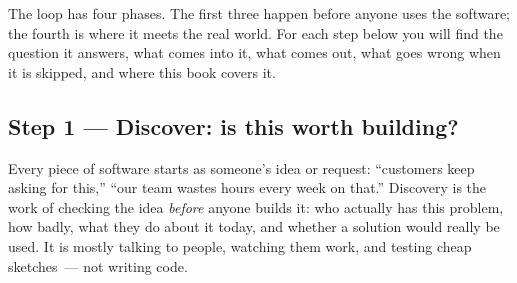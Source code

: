 \label{how-software-gets-built:layer-1-the-loop}

\begin{codebox}[short]

\begin{Shaded}
\begin{Highlighting}[]
\end{Highlighting}
\end{Shaded}

\end{codebox}

\noindent{}The loop has four phases. The first three happen before anyone uses the software; the fourth is where it meets the real world. For each step below you will find the question it answers, what comes into it, what comes out, what goes wrong when it is skipped, and where this book covers it.

\subsection*{Step 1 --- Discover: is this worth building?}\label{how-software-gets-built:step-1--discover-is-this-worth-building}

Every piece of software starts as someone's idea or request: ``customers keep asking for this,'' ``our team wastes hours every week on that.'' Discovery is the work of checking the idea \emph{before} anyone builds it: who actually has this problem, how badly, what they do about it today, and whether a solution would really be used. It is mostly talking to people, watching them work, and testing cheap sketches~--- not writing code.

